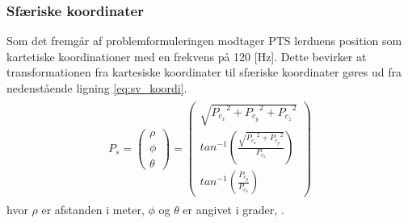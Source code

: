 \subsubsection{Sfæriske koordinater}
Som det fremgår af problemformuleringen modtager PTS lerduens
position som kartetiske koordinationer med en frekvens på 120 [Hz].
Dette bevirker at transformationen fra kartesiske koordinater til
sfæriske koordinater gøres ud fra nedenstående ligning \ref{eq:sv_koordi}.
\begin{align}
\begin{split}
{ P }_{ s } =\left( \begin{matrix} \rho  \\ \phi  \\ \theta  \end{matrix} \right)
	=\left( \begin{matrix} \sqrt { { { P }_{ c_{ x } } }^{ 2 }+{ { P }_{ c_{ y } } }^{ 2 }+{ { P }_{ c_{ z } } }^{ 2 } } 
		\\ { tan }^{ -1 }\left( \frac { \sqrt { { { P }_{ c_{ x } } }^{ 2 }+{ { P }_{ c_{ y } } }^{ 2 } }  }{ { P }_{ c_{ z } } }  \right) 
		\\ { tan }^{ -1 }\left( \frac { { P }_{ c_{ y } } }{ { P }_{ c_{ x } } }  \right)  \end{matrix} \right) 
\label{eq:sv_koordi}
\end{split}
\end{align}
hvor \(\rho\) er afstanden i meter, \(\phi\) og \(\theta\) er angivet i grader, \citep[Kap. 10.6]{adam}.
